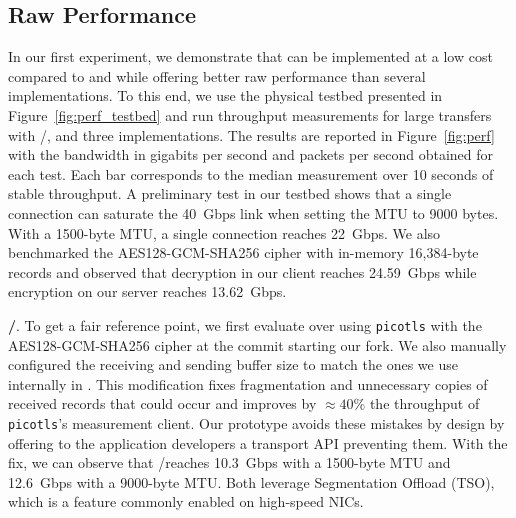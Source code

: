 


\subsection{Raw Performance} \label{sec:perf}
In our first experiment, we demonstrate that \tcpls can be implemented at a low 
cost compared to \tcp and \tls while offering better raw performance than 
several \quic implementations. To this end, we use the physical testbed 
presented in Figure~\ref{fig:perf_testbed} and run throughput measurements for 
large transfers with \tcp/\tls, \tcpls and three \quic implementations.
The results are reported in Figure~\ref{fig:perf} with the bandwidth 
in gigabits per second and packets per second obtained for each test.
Each bar corresponds to the median measurement over 10 seconds of stable 
throughput.
A preliminary test in our testbed shows that a single \tcp connection can 
saturate the 40~Gbps link when setting the MTU to 9000 bytes. With a 1500-byte 
MTU, a single \tcp connection reaches 22~Gbps. We also benchmarked the 
AES128-GCM-SHA256 cipher with in-memory 16,384-byte \tls records and observed 
that decryption in our client reaches 24.59~Gbps while encryption on our 
server reaches 13.62~Gbps.


\textbf{\tcp/\tls}. To get a fair reference point, we first evaluate \tls over 
\tcp using \texttt{picotls} with the AES128-GCM-SHA256 cipher at the commit 
starting our fork. We also manually configured the receiving and sending buffer size 
to match the ones we use internally in \tcpls. This modification fixes fragmentation and 
unnecessary copies of received \tls records that could occur and improves by
$\approx 40\%$ the throughput of \texttt{picotls}'s measurement client. Our 
\tcpls prototype avoids these mistakes by design by offering to the application 
developers a transport API preventing them. %
With the fix, we can observe that \tcp/\tls reaches 
10.3~Gbps with a 1500-byte MTU and 12.6~Gbps with a 9000-byte MTU. Both 
leverage \tcp Segmentation Offload (TSO), which is a feature commonly enabled 
on high-speed NICs.

